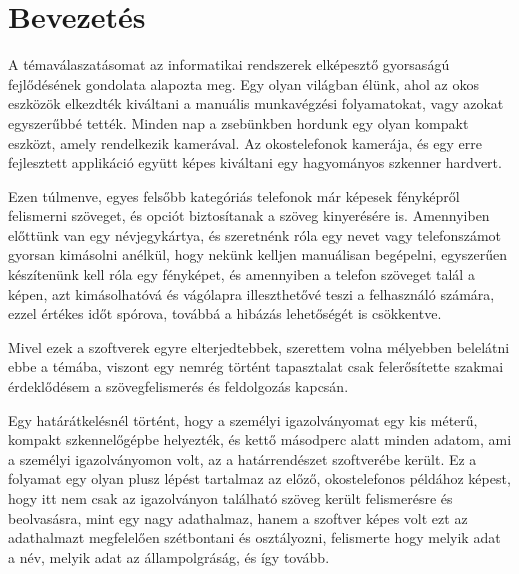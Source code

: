 \documentclass[12pt]{report}
\begin{document}


\tableofcontents

\chapter{Bevezetés}

A témaválaszatásomat az informatikai rendszerek elképesztő gyorsaságú fejlődésének gondolata alapozta meg. Egy olyan világban élünk, ahol az okos eszközök elkezdték kiváltani a manuális munkavégzési folyamatokat, vagy azokat egyszerűbbé tették. Minden nap a zsebünkben hordunk egy olyan kompakt eszközt, amely rendelkezik kamerával. Az okostelefonok kamerája, és egy erre fejlesztett applikáció együtt képes kiváltani egy hagyományos szkenner hardvert.

Ezen túlmenve, egyes felsőbb kategóriás telefonok már képesek fényképről felismerni szöveget, és opciót biztosítanak a szöveg kinyerésére is. Amennyiben előttünk van egy névjegykártya, és szeretnénk róla egy nevet vagy telefonszámot gyorsan kimásolni anélkül, hogy nekünk kelljen manuálisan begépelni, egyszerűen készítenünk kell róla egy fényképet, és amennyiben a telefon szöveget talál a képen, azt kimásolhatóvá és vágólapra illeszthetővé teszi a felhasználó számára, ezzel értékes időt spórova, továbbá a hibázás lehetőségét is csökkentve.

Mivel ezek a szoftverek egyre elterjedtebbek, szerettem volna mélyebben belelátni ebbe a témába, viszont egy nemrég történt tapasztalat csak felerősítette szakmai érdeklődésem a szövegfelismerés és feldolgozás kapcsán. 

Egy határátkelésnél történt, hogy a személyi igazolványomat egy kis méterű, kompakt szkennelőgépbe helyezték, és kettő másodperc alatt minden adatom, ami a személyi igazolványomon volt, az a határrendészet szoftverébe került. Ez a folyamat egy olyan plusz lépést tartalmaz az előző, okostelefonos példához képest, hogy itt nem csak az igazolványon található szöveg került felismerésre és beolvasásra, mint egy nagy adathalmaz, hanem a szoftver képes volt ezt az adathalmazt megfelelően szétbontani és osztályozni, felismerte hogy melyik adat a név, melyik adat az állampolgráság, és így tovább.
\end{document}
